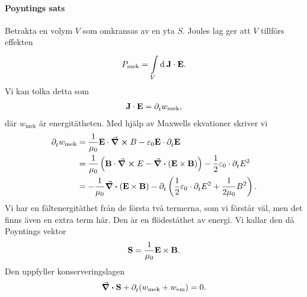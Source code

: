\paragraph{Poyntings sats}
Betrakta en volym $V$ som omkransas av en yta $S$. Joules lag ger att $V$ tillförs effekten
\begin{align*}
	P_{\text{mek}} = \int\limits_{V}^{}\dd[]{}\vb{J}\cdot\vb{E}.
\end{align*}
Vi kan tolka detta som
\begin{align*}
	\vb{J}\cdot\vb{E} = \partial_{t}^{}w_{\text{mek}},
\end{align*}
där $w_{\text{mek}}$ är energitätheten. Med hjälp av Maxwells ekvationer skriver vi
\begin{align*}
	\partial_{t}^{}w_{\text{mek}} &= \frac{1}{\mu_{0}}\vb{E}\cdot\curl{B} - \varepsilon_{0}\vb{E}\cdot\partial_{t}^{}\vb{E} \\
	                        &= \frac{1}{\mu_{0}}\left(\vb{B}\cdot\curl{E} - \div(\vb{E}\times\vb{B})\right) - \frac{1}{2}\varepsilon_{0}\cdot\partial_{t}^{}E^{2} \\
	                        &= -\frac{1}{\mu_{0}}\div(\vb{E}\times\vb{B}) - \partial_{t}^{}\left(\frac{1}{2}\varepsilon_{0}\cdot\partial_{t}^{}E^{2} + \frac{1}{2\mu_{0}}B^{2}\right).
\end{align*}
Vi har en fältenergitäthet från de första två termerna, som vi förstår väl, men det finns även en extra term här. Den är en flödestäthet av energi. Vi kallar den då Poyntings vektor
\begin{align*}
	\vb{S} = \frac{1}{\mu_{0}}\vb{E}\times\vb{B}.
\end{align*}
Den uppfyller konserveringslagen
\begin{align*}
	\div{\vb{S}} + \partial_{t}^{}(w_{\text{mek}} + w_{\text{em}}) = 0.
\end{align*}
